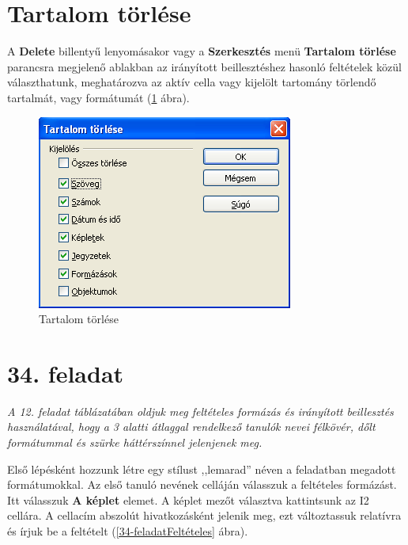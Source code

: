 \section{Tartalom törlése}

A \textbf{Delete} billentyű lenyomásakor vagy a
\textbf{Szerkesztés} menü \textbf{Tartalom törlése} parancsra
megjelenő ablakban az irányított beillesztéshez hasonló
feltételek közül választhatunk, meghatározva az aktív cella
vagy kijelölt tartomány törlendő tartalmát, vagy
formátumát (\ref{TartalomTörlése} ábra).

\begin{figure}[!h]
\begin{center}
\includegraphics[width=8.414cm]{oocalcv2-img161.png}
\caption{Tartalom törlése}\label{TartalomTörlése}
\end{center}
\end{figure}


\section{34. feladat}

{\itshape
A 12. feladat táblázatában oldjuk meg feltételes formázás
és irányított beillesztés használatával, hogy a 3 alatti
átlaggal rendelkező tanulók nevei félkövér, dőlt
formátummal és szürke háttérszínnel jelenjenek meg.}

Első lépésként hozzunk létre egy stílust
,,lemarad'' néven a feladatban
megadott formátumokkal. Az első tanuló nevének celláján
válasszuk a feltételes formázást. Itt válasszuk \textbf{A
képlet} elemet. A képlet mezőt választva kattintsunk az I2
cellára. A cellacím abszolút hivatkozásként jelenik meg, ezt
változtassuk relatívra és írjuk be a feltételt
(\ref{34-feladatFeltételes} ábra).

